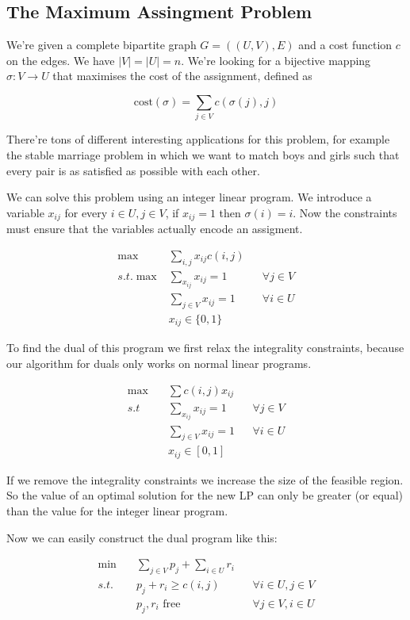 \subsection{The Maximum Assingment Problem}

We're given a complete bipartite graph $G=((U,V),E)$ and a cost function $c$ on the edges. We have $|V|=|U|=n$. We're looking for a bijective mapping $\sigma : V \rightarrow U$ that maximises the cost of the assignment, defined as 

\[\text{cost}(\sigma) = \sum_{j\in V} c(\sigma(j),j)\]

There're tons of different interesting applications for this problem, for example the stable marriage problem in which we want to match boys and girls such that every pair is as satisfied as possible with each other.

We can solve this problem using an integer linear program. We introduce a variable $x_{ij}$ for every $i\in U,j\in V$, if $x_{ij}=1$ then $\sigma(i)=i$. Now the constraints must ensure that the variables actually encode an assigment.

\begin{align*}
\max \quad &  \sum_{i,j} x_{ij} c(i,j)\\
s.t.\max & \sum_{x_{ij}} x_{ij}=1 && \forall j\in V \\
&\sum_{j\in V} x_{ij} = 1 && \forall i\in U\\
&x_{ij}\in \{0,1\}
\end{align*}

To find the dual of this program we first relax the integrality constraints, because our algorithm for duals only works on normal linear programs.

\begin{align*}
\max \quad & \sum c(i,j)x_{ij}\\
s.t & \sum_{x_{ij}} x_{ij}=1 && \forall j\in V \\
	&\sum_{j\in V} x_{ij} = 1 && \forall i\in U\\
	&x_{ij} \in [0,1]
\end{align*}

If we remove the integrality constraints we increase the size of the feasible region. So the value of an optimal solution for the new LP can only be greater (or equal) than the value for the integer linear program. %

Now we can easily construct the dual program like this:

\begin{align*}
\min \quad & \sum_{j\in V} p_j + \sum_{i\in U} r_i\\
s.t.\quad & p_j+r_i\geq c(i,j) &&\forall i\in U, j\in V\\
& p_j,r_i \text{ free} &&\forall j\in V,i\in U
\end{align*}

